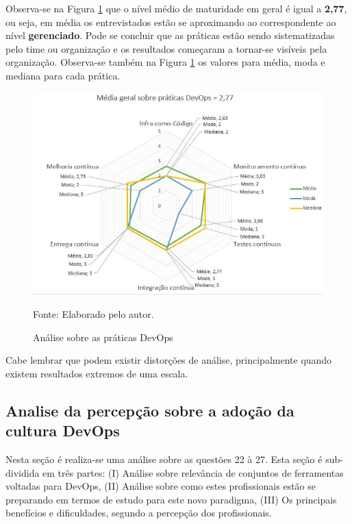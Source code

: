 \documentclass[twoside,english,brazilian]{UNISINOSartigo}
\newcommand{\source}[1]{\caption*{Fonte: {#1}} }
\begin{document}
Observa-se na Figura \ref{fig:pratDevOps} que o nível médio de maturidade em geral é igual a \textbf{2,77}, ou seja, em média os entrevistados estão se aproximando ao correspondente ao nível \textbf{gerenciado}. Pode se concluir que as práticas estão sendo sistematizadas pelo time ou organização e os resultados começaram a tornar-se visíveis pela organização. Observa-se também na Figura \ref{fig:pratDevOps} os valores para média, moda e mediana para cada prática. 
\begin{figure}[H]
    \centering
    \caption{Análise sobre as práticas DevOps}
       \includegraphics[scale=.6]{imagens/maturidade_radar.JPG}
        \source{Elaborado pelo autor.}
    \label{fig:pratDevOps}
\end{figure}

Cabe lembrar que podem existir distorções de análise, principalmente quando existem resultados extremos de uma escala.

\subsection{Analise da percepção sobre a adoção da cultura DevOps}

Nesta seção é realiza-se uma análise sobre as questões 22 à 27. Esta seção é sub-dividida em três partes: (I) Análise sobre relevância de conjuntos de ferramentas voltadas para DevOps, (II) Análise sobre como estes profissionais estão se preparando em termos de estudo para este novo paradigma, (III) Os principais benefícios e dificuldades, segundo a percepção dos profissionais.
\end{document}
